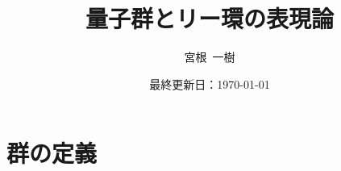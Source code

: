 \documentclass[unicode,a4paper,11pt]{ltjsarticle}
\title{
  量子群とリー環の表現論
}
\author{
  宮根\ 一樹
}
\date{最終更新日：\today}
\theoremstyle{definition}
\renewcommand{\theequation}{$\thesection.\arabic{equation}$}
\renewcommand{\thefigure}{\thesection.\arabic{figure}}
\renewcommand{\thetable}{\thesection.\arabic{table}}
\begin{document}
\maketitle
\tableofcontents

\clearpage
\section{群の定義}










































\clearpage



\nocite{Murakami:2000}
\nocite{Satake:2002}
\end{document}
